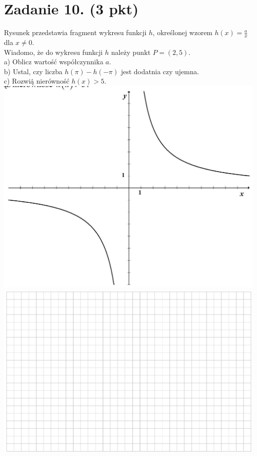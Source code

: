 \documentclass[10pt]{article}
\begin{document}
\section*{Zadanie 10. (3 pkt)}
Rysunek przedstawia fragment wykresu funkcji \(h\), określonej wzorem \(h(x)=\frac{a}{x}\) dla \(x \neq 0\).\\
Wiadomo, że do wykresu funkcji \(h\) należy punkt \(P=(2,5)\).\\
a) Oblicz wartość współczynnika \(a\).\\
b) Ustal, czy liczba \(h(\pi)-h(-\pi)\) jest dodatnia czy ujemna.\\
c) Rozwią̇̇ nierówność \(h(x)>5\).\\
\includegraphics[max width=\textwidth, center]{2024_11_21_2f72fc0c2faed8928619g-14}\\
\includegraphics[max width=\textwidth, center]{2024_11_21_2f72fc0c2faed8928619g-14(1)}\\
\end{document}
